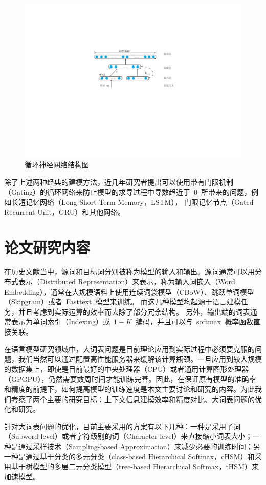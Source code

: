 \begin{figure}
  \centering
  \includegraphics[width=.8\linewidth]{./figures/rnnlm.pdf}
  \caption{循环神经网络结构图}\label{fig:rnnlm}
\end{figure}

除了上述两种经典的建模方法，近几年研究者提出可以使用带有门限机制（Gating）的循环网络来防止模型的求导过程中导数趋近于~0~所带来的问题，例如长短记忆网络（Long Short-Term Memory，LSTM）， 门限记忆节点（Gated Recurrent Unit，GRU）和其他网络。


\section{论文研究内容}
在历史文献当中，源词和目标词分别被称为模型的输入和输出。源词通常可以用分布式表示（Distributed Representation）来表示，称为输入词嵌入（Word Embedding），通常在大规模语料上使用连续词袋模型（CBoW）、跳跃单词模型（Skipgram）或者~Fasttext~模型来训练。
而这几种模型均起源于语言建模任务，并且考虑到实际运算的效率而去除了部分冗余结构。
另外，输出端的词表通常表示为单词索引（Indexing）或~$1-K$~编码，并且可以与~softmax~概率函数直接关联。

在语言模型研究领域中，大词表问题是目前理论应用到实际过程中必须要克服的问题，我们当然可以通过配置高性能服务器来缓解该计算瓶颈。一旦应用到较大规模的数据集上，即使是目前最好的中央处理器（CPU）或者通用计算图形处理器（GPGPU），仍然需要数周时间才能训练完善。因此，在保证原有模型的准确率和精度的前提下，如何提高模型的训练速度是本文主要讨论和研究的内容。为此我们考察了两个主要的研究目标：上下文信息建模效率和精度对比、大词表问题的优化和研究。

针对大词表问题的优化，目前主要采用的方案有以下几种：一种是采用子词（Subword-level）或者字符级别的词（Character-level）来直接缩小词表大小；一种是通过采样技术（Sampling-based Approximation）来减少必要的训练时间；另一种是通过基于分类的多元分类（class-based Hierarchical Softmax，cHSM）和采用基于树模型的多层二元分类模型（tree-based Hierarchical Softmax，tHSM）来加速模型。

